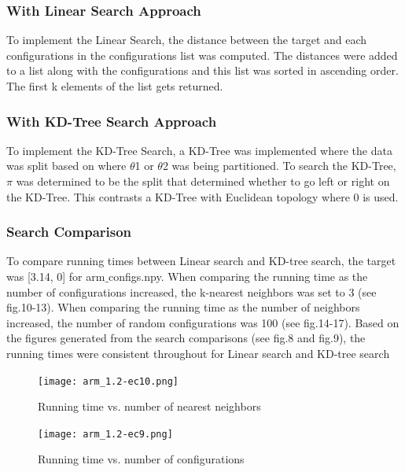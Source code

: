 \documentclass{article}
\begin{document}
\subsubsection{With Linear Search Approach}
To implement the Linear Search, the distance between the target and each configurations in the configurations list was computed. The distances were added to a list along with the configurations and this list was sorted in ascending order. The first k elements of the list gets returned.
\subsubsection{With KD-Tree Search Approach}
To implement the KD-Tree Search, a KD-Tree was implemented where the data was split based on where $\theta$1 or $\theta$2  was being partitioned. To search the KD-Tree, $\pi$  was determined to be the split that determined whether to go left or right on the KD-Tree. This contrasts a KD-Tree with Euclidean topology where 0 is used.
\subsubsection{Search Comparison}
To compare running times between Linear search and KD-tree search, the target was [3.14, 0] for arm$\_$configs.npy. When comparing the running time as the number of configurations increased, the k-nearest neighbors was set to 3 (see fig.10-13). When comparing the running time as the number of neighbors increased, the number of random configurations was 100 (see fig.14-17). Based on the figures generated from the search comparisons (see fig.8 and fig.9), the running times were consistent throughout for Linear search and KD-tree search
\begin{figure}[]
  \centering
    \texttt{[image: arm\_1.2-ec10.png]}
    \caption{Running time vs. number of nearest neighbors}
    \texttt{[image: arm\_1.2-ec9.png]}
    \caption{Running time vs. number of configurations}
\end{figure}
\end{document}
